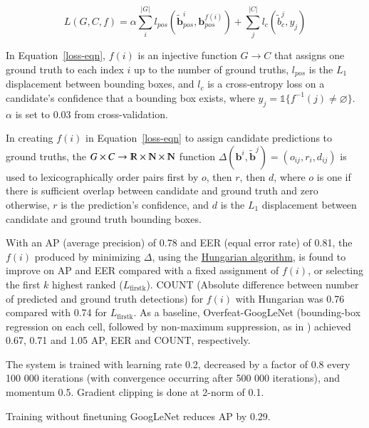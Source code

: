 \documentclass[a4paper, 12pt]{article}
\begin{document}
\begin{equation}
        L(G, C, f) = \alpha\sum_i^{|G|}
                             l_{pos}\left(\tilde{\boldsymbol{b}}_{pos}^i, \boldsymbol{b}_{pos}^{f(i)}\right) +
                     \sum_j^{|C|} l_c\left(\tilde{b}_c^j, y_j\right)
        \label{loss-eqn}
\end{equation}

In Equation~\ref{loss-eqn}, $f(i)$ is an injective function $G \rightarrow C$
that assigns one ground truth to each index $i$ up to the number of ground
truths, $l_{pos}$ is the $L_1$ displacement between bounding boxes, and $l_c$
is a cross-entropy loss on a candidate's confidence that a bounding box exists,
where $y_j = \mathbb{1}\{f^{-1}(j) \neq \varnothing\}$. $\alpha$ is set to 0.03
from cross-validation.

In creating $f(i)$ in Equation~\ref{loss-eqn} to assign candidate predictions
to ground truths, the
$G \times C \rightarrow \varmathbb{R} \times \varmathbb{N} \times \varmathbb{N}$
function
$\Delta\left(\boldsymbol{b}^i, \tilde{\boldsymbol{b}}^j\right) = (o_{ij}, r_i, d_{ij})$
is used to lexicographically order pairs first by $o$, then $r$, then $d$,
where $o$ is one if there is sufficient overlap between candidate and ground
truth and zero otherwise, $r$ is the prediction's confidence, and $d$ is the
$L_1$ displacement between candidate and ground truth bounding boxes.

With an AP (average precision) of 0.78 and EER (equal error rate) of 0.81, the
$f(i)$ produced by minimizing $\Delta$, using the
\href{https://en.wikipedia.org/wiki/Hungarian_algorithm}{Hungarian algorithm},
is found to improve on AP and EER compared with a fixed assignment of $f(i)$,
or selecting the first $k$ highest ranked ($L_\textrm{firstk}$). COUNT
(Absolute difference between number of predicted and ground truth detections)
for $f(i)$ with Hungarian was 0.76 compared with 0.74 for $L_\textrm{firstk}$.
As a baseline, Overfeat-GoogLeNet (bounding-box regression on each cell,
followed by non-maximum suppression, as in
\cite{DBLP:journals/corr/SermanetEZMFL13}) achieved 0.67, 0.71 and 1.05 AP, EER
and COUNT, respectively.

The system is trained with learning rate 0.2, decreased by a factor of 0.8
every 100 000 iterations (with convergence occurring after 500 000 iterations),
and momentum 0.5. Gradient clipping is done at 2-norm of 0.1.

Training without finetuning GoogLeNet reduces AP by 0.29.
\end{document}
